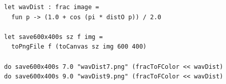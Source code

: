 \documentclass[rgb]{beamer}
\begin{document}
\begin{frame}[fragile]
\begin{footnotesize}

\begin{lstlisting}[numbers=none,frame=none,mathescape]
let wavDist : frac image =
  fun p -> (1.0 + cos (pi * distO p)) / 2.0

let save600x400s sz f img =
  toPngFile f (toCanvas sz img 600 400)

do save600x400s 7.0 "wavDist7.png" (fracToFColor << wavDist)
do save600x400s 9.0 "wavDist9.png" (fracToFColor << wavDist)
\end{lstlisting}

\mbox{ }\hfill
{}\hfill
{}
\hfill \mbox{ }

\end{footnotesize}
\end{frame}
\end{document}
